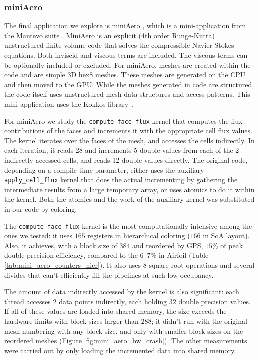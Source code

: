 \subsubsection{miniAero}\label{sec:mini-aero-summary}

The final application we explore is miniAero \cite{miniaero}, which is a 
mini-application from the Mantevo suite \cite{heroux2009improving}. MiniAero is 
an explicit (4th order Runge-Kutta) unstructured finite volume code that solves 
the compressible Navier-Stokes equations. Both inviscid and viscous terms are 
included. The viscous terms can be optionally included or excluded. For 
miniAero, meshes are created within the code and are simple 3D hex8 meshes. 
These meshes are generated on the CPU and then moved to the GPU. While 
the meshes generated in code are structured, the code itself uses unstructured 
mesh data structures and access patterns. This mini-application uses the Kokkos 
library~\cite{CarterEdwards20143202}.

For miniAero we study the \texttt{compute\_face\_flux} kernel that computes the
flux contributions of the faces and increments it with the appropriate cell flux
values. The kernel iterates over the faces of the mesh, and accesses the cells
indirectly. In each iteration, it reads 28 and increments 5 double values from
each of the 2 indirectly accessed cells, and reads 12 double values directly. 
The original code, depending on a compile time parameter, either uses 
the auxiliary \texttt{apply\_cell\_flux} kernel that does the actual 
incrementing by gathering the intermediate results from a large temporary array, 
or uses atomics to do it within the kernel. Both the atomics and the work of 
the auxiliary kernel was substituted in our code by coloring.




The \texttt{compute\_face\_flux} kernel is the most computationally intensive
among the ones we tested: it uses $165$ registers in hierarchical coloring
($166$ in SoA layout). Also, it achieves, with a block size of $384$ and 
reordered by GPS, $15\%$ of peak double precision efficiency, compared to the 
$6$--$7\%$ in Airfoil (Table \ref{tab:mini_aero_counters_hier}). It also uses 
$8$ square root operations and several divides that can't efficiently fill the 
pipelines at such low occupancy. 

The amount of data indirectly accessed by the kernel is also significant: each 
thread accesses $2$ data points indirectly, each holding $32$ double precision 
values. If all of these values are loaded into shared memory, the size exceeds 
the hardware limits with block sizes larger than $288$; it didn't run with the 
original mesh numbering with any block size, and only with smaller block sizes 
on the reordered meshes (Figure \ref{fig:mini_aero_bw_crash}). The other 
measurements were carried out by only loading the incremented data into shared 
memory.

